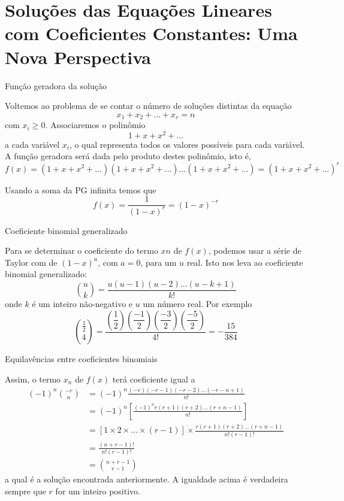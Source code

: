 \section*{Soluções das Equações Lineares com Coeficientes Constantes: Uma Nova Perspectiva}

\begin{frame}[fragile]{Função geradora da solução}

Voltemos ao problema de se contar o número de soluções distintas da equação
\[
        x_1 + x_2 + \ldots + x_r = n
\]
com $x_i \geq 0$. Associaremos o polinômio
\[
        1 + x + x^2 + \ldots
\]
a cada variável $x_i$, o qual representa todos os valores possíveis para cada variável. A função
geradora será dada pelo produto destes polinômio, isto é,
\[
        f(x) = (1 + x + x^2 + \ldots)(1 + x + x^2 + \ldots) \ldots (1 + x + x^2 + \ldots)
             = (1 + x + x^2 + \ldots)^r
\]

Usando a soma da PG infinita temos que
\[
        f(x) = \frac{1}{(1 - x)^r} = (1 - x)^{-r}
\]

\end{frame}

\begin{frame}[fragile]{Coeficiente binomial generalizado}

Para se determinar o coeficiente do termo $xn$ de $f(x)$, podemos usar a série de Taylor com 
de $(1 - x)^u$, com $ a=0$, para um $u$ real. Isto nos leva ao coeficiente binomial generalizado:
\[
        \binom{u}{k} = \frac{u(u - 1)(u - 2) \ldots (u - k + 1)}{k!}
\]
onde $k$ é um inteiro não-negativo e $u$ um número real. Por exemplo
\[
        \binom{\frac{1}{2}}{4} = \dfrac{\left(\dfrac{1}{2}\right)\left(\dfrac{-1}{2}\right)\left(\dfrac{-3}{2}\right)\left(\dfrac{-5}{2}\right)}{4!} = -\frac{15}{384}
\]
\end{frame}

\begin{frame}[fragile]{Equilavências entre coeficientes binomiais}

Assim, o termo $x_n$ de $f(x)$ terá coeficiente igual a
\[
\begin{split}
        (-1)^n \binom{-r}{n} &= (-1)^n \frac{(-r)(-r - 1)(-r - 2) \ldots (-r - n + 1)}{n!} \\
                             &= (-1)^n \left[\frac{(-1)^n r(r + 1)(r + 2) \ldots (r + n - 1)}{n!}\right] \\
                             &= \left[1 \times 2 \times \ldots \times (r - 1)\right]\times \frac{r(r + 1)(r + 2) \ldots (r + n - 1)}{n!(r - 1)!} \\
                             &= \frac{(n + r - 1)!}{n!(r - 1)!} \\
                             &= \binom{n + r - 1}{r - 1}
\end{split}
\]
a qual é a solução encontrada anteriormente. A igualdade acima é verdadeira sempre que $r$ for
um inteiro positivo.

\end{frame}


